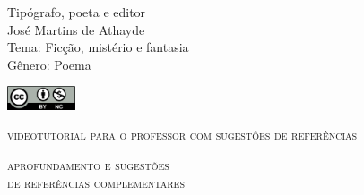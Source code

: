 \documentclass[smaller,professionalfonts,15pt]{beamer}
\begin{document}
										\begin{frame}\begin{raggedleft}
										\Huge 
Tipógrafo, poeta e editor				\\
										\huge 
José Martins de Athayde					\\
										\bigskip
										\normalsize
Tema: Ficção, mistério e fantasia		\\	
Gênero: Poema							\\\vfill\hfill
\publishername

										\end{raggedleft}

\smallskip\includegraphics[width=2cm]{ccbync.png}\hfill
\end{frame}


\begin{frame}{\textsc{videotutorial para o professor com sugestões de referências}}
\vspace{-2cm}\begin{figure}
\end{figure}
\end{frame}



\begin{frame}
\hfill\Huge
\textsc{aprofundamento e sugestões\\\hfill de referências complementares}
\end{frame}
\end{document}
